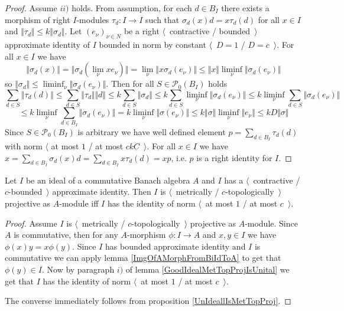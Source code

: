 \begin{proof}
Assume $ii)$ holds. From assumption, for each $d\in B_I$ there exists a morphism of right $I$-modules $\tau_d:I\to I$ such that $\sigma_d(x)d=x\tau_d(d)$ for all $x\in I$ and $\Vert\tau_d\Vert\leq k\Vert\sigma_d\Vert$.  Let $(e_\nu)_{\nu\in N}$ be a right $\langle$~contractive / bounded~$\rangle$ approximate identity of $I$ bounded in norm by constant $\langle$~$D=1$ / $D=c$~$\rangle$. For all $x\in I$ we have
$$
\Vert\sigma_d(x)\Vert
=\Vert\sigma_d(\lim_\nu x e_\nu)\Vert
=\lim_\nu\Vert x\sigma_d(e_\nu)\Vert
\leq\Vert x\Vert\liminf_\nu\Vert\sigma_d(e_\nu)\Vert
$$
so $\Vert\sigma_d\Vert\leq \liminf_\nu\Vert\sigma_d(e_\nu)\Vert$. Then for all $S\in\mathcal{P}_0(B_I)$ holds
$$
\sum_{d\in S}\Vert \tau_d(d)\Vert
\leq \sum_{d\in S}\Vert \tau_d\Vert\Vert d\Vert
\leq k\sum_{d\in S}\Vert \sigma_d\Vert
\leq k\sum_{d\in S}\liminf_\nu \Vert \sigma_d(e_\nu)\Vert
\leq k\liminf_{\nu}\sum_{d\in S}\Vert \sigma_d(e_\nu) \Vert
$$
$$
\leq k\liminf_{\nu}\sum_{d\in B_I}\Vert \sigma_d(e_\nu) \Vert
=k\liminf_{\nu}\Vert\sigma(e_\nu)\Vert
\leq k\Vert\sigma\Vert\liminf_{\nu}\Vert e_\nu\Vert
\leq kD\Vert\sigma\Vert
$$
Since $S\in \mathcal{P}_0(B_I)$ is arbitrary we have well defined element $p=\sum_{d\in B_I}\tau_d(d)$ with norm $\langle$ at most $1$ / at most $ckC$~$\rangle$. For all $x\in I$ we have $x=\sum_{d\in B_I}\sigma_d(x)d=\sum_{d\in B_I}x\tau_d(d)=xp$, i.e. $p$ is a right identity for $I$.
\end{proof}

\begin{theorem}\label{GoodCommIdealMetTopProjIsUnital} Let $I$ be an ideal of a commutative Banach algebra $A$ and $I$ has a $\langle$~contractive / $c$-bounded~$\rangle$ approximate identity. Then $I$ is $\langle$~metrically / $c$-topologically~$\rangle$ projective as $A$-module iff $I$ has the identity of norm $\langle$~at most $1$ / at most $c$~$\rangle$.
\end{theorem} 
\begin{proof} Assume $I$ is $\langle$~metrically / $c$-topologically~$\rangle$ projective as $A$-module. Since $A$ is commutative, then for any $A$-morphism $\phi:I\to A$ and $x,y\in I$ we have $\phi(x)y=x\phi(y)$. Since $I$ has bounded approximate identity and $I$ is commutative we can apply lemma \ref{ImgOfAMorphFromBiIdToA} to get that $\phi(y)\in I$. Now by paragraph $i)$ of lemma \ref{GoodIdealMetTopProjIsUnital} we get that $I$ has the identity of norm $\langle$~at most $1$ / at most $c$~$\rangle$.

The converse immediately follows from proposition \ref{UnIdeallIsMetTopProj}.
\end{proof}

